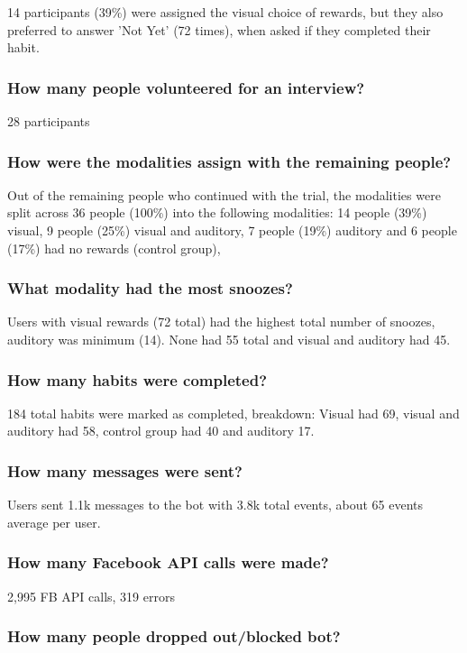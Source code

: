 14 participants (39\%) were assigned the visual choice of rewards, but they also preferred to answer 'Not Yet' (72 times), when asked if they completed their habit.


\subsubsection*{How many people volunteered for an interview?}
28 participants


\subsubsection*{How were the modalities assign with the remaining people?}
Out of the remaining people who continued with the trial, the modalities were split across 36 people (100\%) into the following modalities: 14 people (39\%) visual, 9 people (25\%) visual and auditory, 7 people (19\%) auditory and 6 people (17\%) had no rewards (control group),


\subsubsection*{What modality had the most snoozes?}
Users with visual rewards (72 total) had the highest total number of snoozes, auditory was minimum (14). None had 55 total and visual and auditory had 45.

\subsubsection*{How many habits were completed?}
184 total habits were marked as completed, breakdown: Visual had 69, visual and auditory had 58, control group had 40 and auditory 17.

\subsubsection*{How many messages were sent?}
Users sent 1.1k messages to the bot with 3.8k total events, about 65 events average per user.

\subsubsection*{How many Facebook API calls were made?}
2,995 FB API calls, 319 errors

\subsubsection*{How many people dropped out/blocked bot?}

